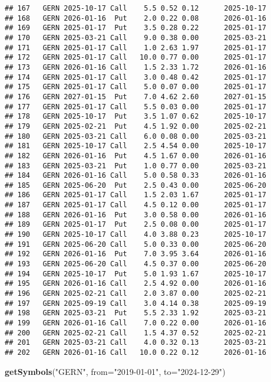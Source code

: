 \documentclass[
]{article}
\newenvironment{Shaded}{\begin{snugshade}}{\end{snugshade}}
\newcommand{\AttributeTok}[1]{\textcolor[rgb]{0.13,0.29,0.53}{#1}}
\newcommand{\FunctionTok}[1]{\textcolor[rgb]{0.13,0.29,0.53}{\textbf{#1}}}
\newcommand{\NormalTok}[1]{#1}
\newcommand{\StringTok}[1]{\textcolor[rgb]{0.31,0.60,0.02}{#1}}
\begin{document}
\begin{verbatim}
## 167   GERN 2025-10-17 Call    5.5 0.52 0.12      2025-10-17
## 168   GERN 2026-01-16  Put    2.0 0.22 0.08      2026-01-16
## 169   GERN 2025-01-17  Put    3.5 0.28 0.22      2025-01-17
## 170   GERN 2025-03-21 Call    9.0 0.38 0.00      2025-03-21
## 171   GERN 2025-01-17 Call    1.0 2.63 1.97      2025-01-17
## 172   GERN 2025-01-17 Call   10.0 0.77 0.00      2025-01-17
## 173   GERN 2026-01-16 Call    1.5 2.33 1.72      2026-01-16
## 174   GERN 2025-01-17 Call    3.0 0.48 0.42      2025-01-17
## 175   GERN 2025-01-17 Call    5.0 0.07 0.00      2025-01-17
## 176   GERN 2027-01-15  Put    7.0 4.62 2.60      2027-01-15
## 177   GERN 2025-01-17 Call    5.5 0.03 0.00      2025-01-17
## 178   GERN 2025-10-17  Put    3.5 1.07 0.62      2025-10-17
## 179   GERN 2025-02-21  Put    4.5 1.92 0.00      2025-02-21
## 180   GERN 2025-03-21 Call    6.0 0.08 0.00      2025-03-21
## 181   GERN 2025-10-17 Call    2.5 4.54 0.00      2025-10-17
## 182   GERN 2026-01-16  Put    4.5 1.67 0.00      2026-01-16
## 183   GERN 2025-03-21  Put    1.0 0.77 0.00      2025-03-21
## 184   GERN 2026-01-16 Call    5.0 0.58 0.33      2026-01-16
## 185   GERN 2025-06-20  Put    2.5 0.43 0.00      2025-06-20
## 186   GERN 2025-01-17 Call    1.5 2.03 1.67      2025-01-17
## 187   GERN 2025-01-17 Call    4.5 0.12 0.00      2025-01-17
## 188   GERN 2026-01-16  Put    3.0 0.58 0.00      2026-01-16
## 189   GERN 2025-01-17  Put    2.5 0.08 0.00      2025-01-17
## 190   GERN 2025-10-17 Call    4.0 3.88 0.23      2025-10-17
## 191   GERN 2025-06-20 Call    5.0 0.33 0.00      2025-06-20
## 192   GERN 2026-01-16  Put    7.0 3.95 3.64      2026-01-16
## 193   GERN 2025-06-20 Call    4.5 0.37 0.00      2025-06-20
## 194   GERN 2025-10-17  Put    5.0 1.93 1.67      2025-10-17
## 195   GERN 2026-01-16 Call    2.5 4.92 0.00      2026-01-16
## 196   GERN 2025-02-21 Call    2.0 3.87 0.00      2025-02-21
## 197   GERN 2025-09-19 Call    3.0 4.14 0.38      2025-09-19
## 198   GERN 2025-03-21  Put    5.5 2.33 1.92      2025-03-21
## 199   GERN 2026-01-16 Call    7.0 0.22 0.00      2026-01-16
## 200   GERN 2025-02-21 Call    1.5 4.37 0.52      2025-02-21
## 201   GERN 2025-03-21 Call    4.0 0.32 0.13      2025-03-21
## 202   GERN 2026-01-16 Call   10.0 0.22 0.12      2026-01-16
\end{verbatim}

\begin{Shaded}
\begin{Highlighting}[]
\FunctionTok{getSymbols}\NormalTok{(}\StringTok{"GERN"}\NormalTok{, }\AttributeTok{from=}\StringTok{"2019{-}01{-}01"}\NormalTok{, }\AttributeTok{to=}\StringTok{"2024{-}12{-}29"}\NormalTok{)  }
\end{Highlighting}
\end{Shaded}
\end{document}
